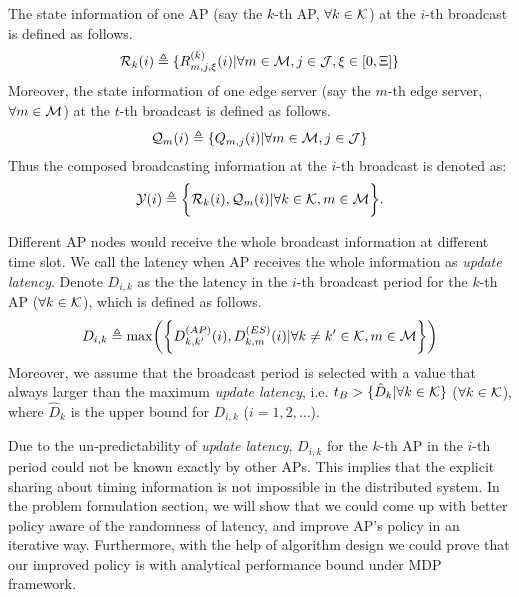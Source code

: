 The state information of one AP (say the $k$-th AP, $\forall k\in\mathcal{K}$) at the $i$-th broadcast is defined as follows.
\begin{align}
    \mathcal{R}_{k}(i) \triangleq \{R^{(k)}_{m,j,\xi}(i) | \forall m\in\mathcal{M}, j\in\mathcal{J}, \xi \in [0,\Xi]\}
\end{align}
Moreover, the state information of one edge server (say the $m$-th edge server, $\forall m\in\mathcal{M}$) at the $t$-th broadcast is defined as follows.
\begin{align}
    \mathcal{Q}_{m}(i) \triangleq \{Q_{m,j}(i) | \forall m\in\mathcal{M}, j\in\mathcal{J}\}
\end{align}
Thus the composed broadcasting information at the $i$-th broadcast is denoted as:
\begin{align}
    \mathcal{Y}(i) \triangleq
        \bigg\{
            \mathcal{R}_{k}(i), \mathcal{Q}_{m}(i) | \forall k\in\mathcal{K}, m\in\mathcal{M}
        \bigg\}.
\end{align}

Different AP nodes would receive the whole broadcast information at different time slot.
We call the latency when AP receives the whole information as \emph{update latency}.
Denote $D_{i,k}$ as the the latency in the $i$-th broadcast period for the $k$-th AP ($\forall k\in\mathcal{K}$), which is defined as follows.
\begin{align}
    D_{i,k} \define \max\Paren{\Brace{
        D^{(AP)}_{k,k'}(i),
        D^{(ES)}_{k,m}(i) | \forall k \neq k' \in \apSet, m\in\esSet
    }}
\end{align}
Moreover, we assume that the broadcast period is selected with a value that always larger than the maximum \emph{update latency}, i.e. $t_B > \{\hat{D}_k|\forall k\in\mathcal{K}\}$ ($\forall k\in\mathcal{K}$), where $\hat{D}_k$ is the upper bound for $D_{i,k}$ ($i=1,2,\dots$).

Due to the un-predictability of \emph{update latency}, $D_{i,k}$ for the $k$-th AP in the $i$-th period could not be known exactly by other APs. This implies that the explicit sharing about timing information is not impossible in the distributed system.
In the problem formulation section, we will show that we could come up with better policy aware of the randomness of latency, and improve AP's policy in an iterative way.
Furthermore, with the help of algorithm design we could prove that our improved policy is with analytical performance bound under MDP framework.

